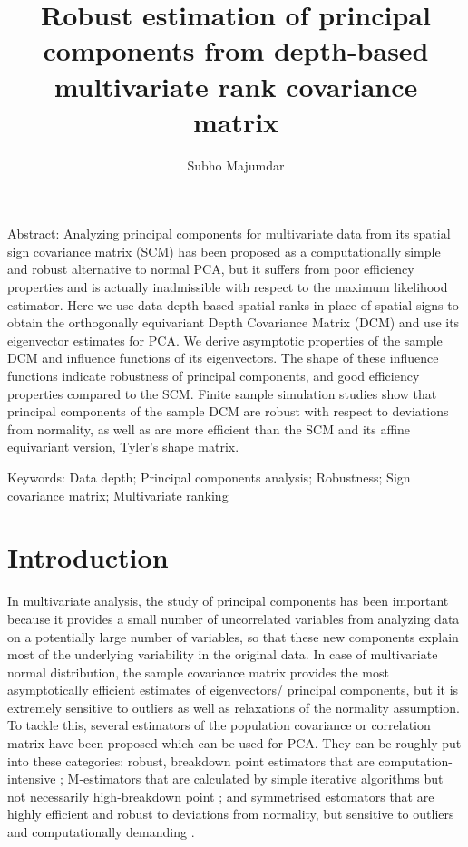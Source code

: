 \documentclass[fleqn,12pt]{article}
\begin{document}
\newtheorem{Theorem}{Theorem}[section]
\newtheorem{Lemma}[Theorem]{Lemma}
\newtheorem{Corollary}[Theorem]{Corollary}

\title{Robust estimation of principal components from depth-based multivariate rank covariance matrix}
\date{}
\author{Subho Majumdar}
\maketitle

Abstract:
Analyzing principal components for multivariate data from its spatial sign covariance matrix (SCM) has been proposed as a computationally simple and robust alternative to normal PCA, but it suffers from poor efficiency properties and is actually inadmissible with respect to the maximum likelihood estimator. Here we use data depth-based spatial ranks in place of spatial signs to obtain the orthogonally equivariant Depth Covariance Matrix (DCM) and use its eigenvector estimates for PCA. We derive asymptotic properties of the sample DCM and influence functions of its eigenvectors. The shape of these influence functions indicate robustness of principal components, and good efficiency properties compared to the SCM. Finite sample simulation studies show that principal components of the sample DCM are robust with respect to deviations from normality, as well as are more efficient than the SCM and its affine equivariant version, Tyler's shape matrix.
\vspace{.5cm}

Keywords:
Data depth; Principal components analysis; Robustness; Sign covariance matrix; Multivariate ranking

\section{Introduction}
In multivariate analysis, the study of principal components has been important because it provides a small number of uncorrelated variables from analyzing data on a potentially large number of variables, so that these new components explain most of the underlying variability in the original data. In case of multivariate normal distribution, the sample covariance matrix provides the most asymptotically efficient estimates of eigenvectors/ principal components, but it is extremely sensitive to outliers as well as relaxations of the normality assumption. To tackle this, several estimators of the population covariance or correlation matrix have been proposed which can be used for PCA. They can be roughly put into these categories: robust, breakdown point estimators that are computation-intensive \citep{rousseeuw85, maronna76}; M-estimators that are calculated by simple iterative algorithms but not necessarily high-breakdown point \citep{huber77, tyler87}; and symmetrised estomators that are highly efficient and robust to deviations from normality, but sensitive to outliers and computationally demanding \citep{dumbgen98, sirkia07}.
\end{document}
